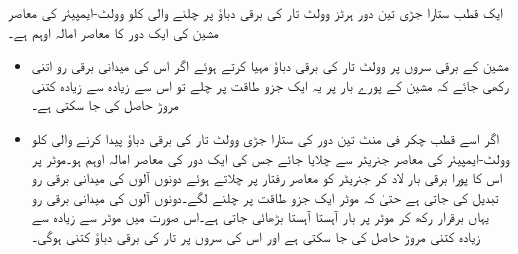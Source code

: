 ایک  قطب ستارا جڑی تین دور  ہرٹز  وولٹ تار کی برقی دباؤ پر چلنے والی  کلو وولٹ-ایمپیئر کی معاصر مشین کی ایک دور کا معاصر امالہ  اوہم ہے۔
\begin{itemize}
\item
مشین کے برقی سروں پر  وولٹ تار کی برقی دباؤ مہیا کرتے ہوئے اگر اس کی میدانی برقی رو اتنی رکھی جائے کہ مشین کے پورے بار پر یہ  ایک جزو طاقت پر چلے تو اس سے زیادہ سے زیادہ کتنی مروڑ حاصل کی جا سکتی ہے۔
\item
اگر اسے    قطب   چکر فی منٹ تین دور کی ستارا جڑی  وولٹ تار کی برقی دباؤ پیدا کرنے والی   کلو وولٹ-ایمپیئر کی معاصر جنریٹر سے چلایا جائے جس کی ایک دور کی معاصر امالہ  اوہم ہو۔موٹر پر اس کا پورا برقی بار لاد کر جنریٹر کو معاصر رفتار پر چلاتے ہوئے دونوں آلوں کی میدانی برقی رو تبدیل کی جاتی ہے حتیٰ کہ موٹر ایک جزو طاقت پر چلنے لگے۔دونوں آلوں کی میدانی برقی رو یہاں برقرار رکھ کر موٹر پر بار آہستا آہستا بڑھائی جاتی ہے۔اس صورت میں موٹر سے زیادہ سے زیادہ کتنی مروڑ  حاصل کی جا سکتی ہے اور اس کی سروں پر تار کی برقی دباؤ کتنی ہوگی۔ 
\end{itemize}

